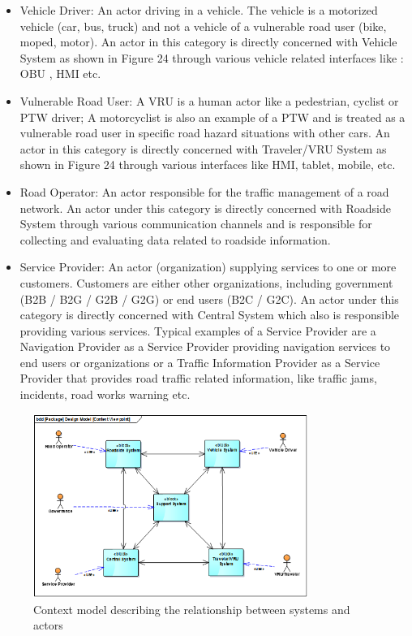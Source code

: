 \documentclass[letterpaper, 10 pt, conference]{ieeeconf}  %
\begin{document}
\begin{itemize}
	\item Vehicle Driver: An actor driving in a vehicle. The vehicle is a motorized vehicle (car, bus, truck) and not a vehicle of a vulnerable road user (bike, moped, motor). An actor in this category is directly concerned with Vehicle System as shown in Figure 24 through various vehicle related interfaces like : OBU , HMI etc.
	\item Vulnerable Road User: A VRU is a human actor like a pedestrian, cyclist or PTW driver; A motorcyclist is also an example of a PTW and is treated as a vulnerable road user in specific road hazard situations with other cars. An actor in this category is directly concerned with Traveler/VRU System as shown in Figure 24 through various interfaces like HMI, tablet, mobile, etc.
	\item  Road Operator: An actor responsible for the traffic management of a road network. An actor under this category is directly concerned with Roadside System through various communication channels and is responsible for collecting and evaluating data related to roadside information.
	\item Service Provider: An actor (organization) supplying services to one or more customers. Customers are either other organizations, including government (B2B / B2G / G2B / G2G) or end users (B2C / G2C). An actor under this category is directly concerned with Central System which also is responsible providing various services. Typical examples of a Service Provider are a Navigation Provider as a Service Provider providing navigation services to end users or organizations or a Traffic Information Provider as a Service Provider that provides road traffic related information, like traffic jams, incidents, road works warning etc.
\end{itemize}

\begin{figure}[t!]
	\centering
	\includegraphics[width=0.80\textwidth]{context_model}
	\caption{Context model describing the relationship between systems and actors}
	\label{context_model}
	\centering
\end{figure}
\end{document}
